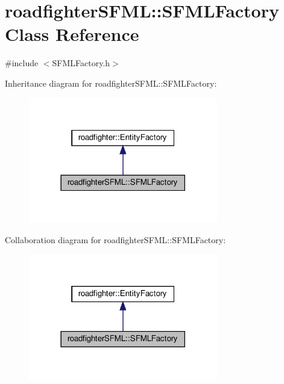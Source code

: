 \hypertarget{classroadfighterSFML_1_1SFMLFactory}{}\section{roadfighter\+S\+F\+ML\+:\+:S\+F\+M\+L\+Factory Class Reference}
\label{classroadfighterSFML_1_1SFMLFactory}


{\ttfamily \#include $<$S\+F\+M\+L\+Factory.\+h$>$}



Inheritance diagram for roadfighter\+S\+F\+ML\+:\+:S\+F\+M\+L\+Factory\+:\nopagebreak
\begin{figure}[H]
\begin{center}
\leavevmode
\includegraphics[width=234pt]{classroadfighterSFML_1_1SFMLFactory__inherit__graph}
\end{center}
\end{figure}


Collaboration diagram for roadfighter\+S\+F\+ML\+:\+:S\+F\+M\+L\+Factory\+:\nopagebreak
\begin{figure}[H]
\begin{center}
\leavevmode
\includegraphics[width=234pt]{classroadfighterSFML_1_1SFMLFactory__coll__graph}
\end{center}
\end{figure}
